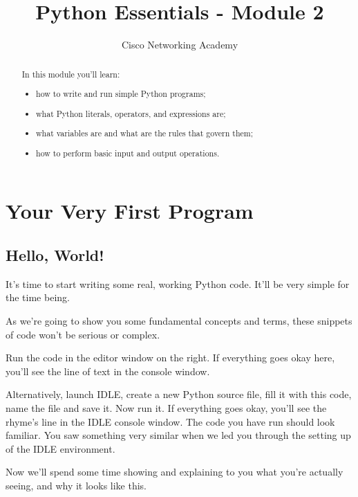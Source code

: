 \documentclass[a4paper,10pt]{article}
\title{Python Essentials - Module 2}
\author{Cisco Networking Academy}
\begin{document}
\maketitle{}
\tableofcontents
{}

\begin{abstract}
In this module you'll learn:
\begin{itemize}
 \item how to write and run simple Python programs;
 \item what Python literals, operators, and expressions are;
 \item what variables are and what are the rules that govern them;
 \item how to perform basic input and output operations.
\end{itemize}
\end{abstract}

\section{Your Very First Program}
\subsection{Hello, World!}
It's time to start writing some real, working Python code. It'll be very simple for the time being.
\newline

As we're going to show you some fundamental concepts and terms, these snippets of code won't be serious or complex.
\newline

Run the code in the editor window on the right. If everything goes okay here, you'll see the line of text in the console window.
\newline

Alternatively, launch IDLE, create a new Python source file, fill it with this code, name the file and save it. Now run it. If everything goes okay, you'll see the rhyme's line in the IDLE console window. The code you have run should look familiar. You saw something very similar when we led you through the setting up of the IDLE environment.
\newline

Now we'll spend some time showing and explaining to you what you're actually seeing, and why it looks like this.
\newline
\end{document}
